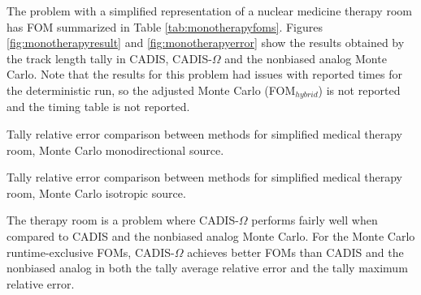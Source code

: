 The problem with a simplified representation of a nuclear medicine therapy room
has FOM summarized in Table
\ref{tab:monotherapyfoms}. Figures
\ref{fig:monotherapyresult} and \ref{fig:monotherapyerror} show the results obtained
by the track length tally in CADIS, CADIS-$\Omega$ and the nonbiased analog
Monte Carlo. Note that the results for this problem had issues with reported
times for the deterministic run, so the adjusted Monte Carlo
(FOM$_{hybrid}$) is not reported and the timing table is not reported.

\begin{table}[h!]
  \centering
  
  \caption[Tally results comparison between methods for simplified medical
  therapy room, Monte Carlo monodirectional source.]{Tally relative error comparison between methods for simplified
  medical therapy room, Monte Carlo monodirectional source.}
  \label{tab:monotherapyfoms}
\end{table}

\begin{table}[h!]
  \centering
  
  \caption[Tally results comparison between methods for simplified medical
  therapy room, Monte Carlo isotropic source.]{Tally relative error comparison between methods for simplified
  medical therapy room, Monte Carlo isotropic source.}
  \label{tab:isotherapyfoms}
\end{table}

The therapy room is a problem where CADIS-$\Omega$ performs fairly well when
compared to CADIS and the nonbiased analog Monte Carlo. For the Monte Carlo
runtime-exclusive FOMs, CADIS-$\Omega$ achieves better FOMs than CADIS and the
nonbiased analog in both the tally average relative error and the tally maximum
relative error.

